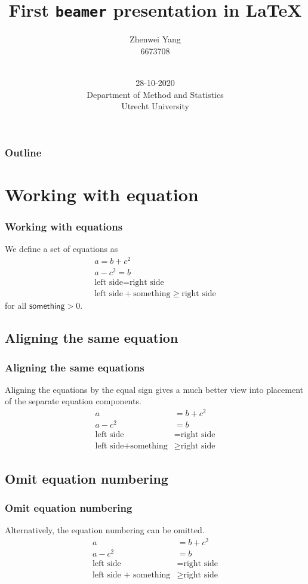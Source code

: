 \documentclass[aspectratio43]{beamer}
\title{First \texttt{beamer} presentation in \LaTeX}
\author[Zhenwei Yang]{Zhenwei Yang \\ 6673708}
\date
{\vspace{.6 in} \\ \small{28-10-2020 \\ Department of Method and Statistics \\ Utrecht University}
	\vskip6mm}
\begin{document}
\titlepage 

\begin{frame}
\frametitle{Outline}
\tableofcontents	
\end{frame}

\section{Working with equation}
\begin{frame}
\frametitle{Working with equations}
	We define a set of equations as
	\begin{gather}
		a = b + c^2 \\
		a - c^2 = b	\\
		\text{left side} = \text{right side} \\
		\text{left side} + \text{something} \geq \text{right side}
	\end{gather}
	for all $\mathsf{something}> 0$.

\end{frame}

\subsection{Aligning the same equation}
\begin{frame}
\frametitle{Aligning the same equations}
	Aligning the equations by the equal sign gives a much better view into placement of the separate equation components.
	\begin{align}
		a &= b + c^2 \\
		a - c^2 &= b	\\
		\text{left side} &= \text{right side} \\
		\text{left side} + \text{something} &\geq \text{right side}
	\end{align}

\end{frame}

\subsection{Omit equation numbering}
\begin{frame}
\frametitle{Omit equation numbering}
	Alternatively, the equation numbering can be omitted.
	\begin{align*}
	a &= b + c^2 \\
	a - c^2 &= b \\
	\text{left side} &= \text{right side} \\
	\text{left side + something} &\geq	\text{right side}
	\end{align*}
\end{frame}
\end{document}

